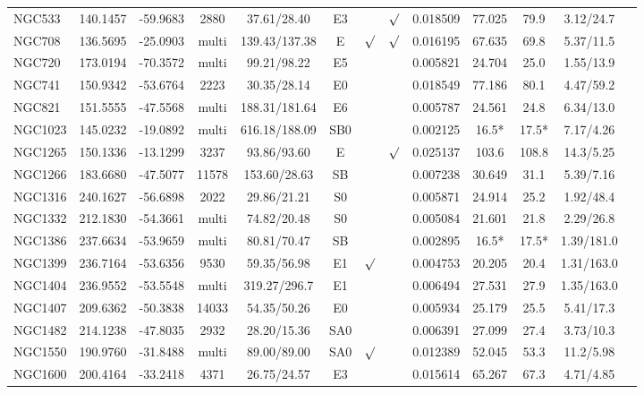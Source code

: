 \documentclass[iop]{emulateapj}
\begin{document}
\begin{table}
\begin{tabular}{lcccccccccccc}
NGC533  & 140.1457 & -59.9683 & 2880 & 37.61/28.40 & E3 & & $\surd$ & 0.018509 & 77.025 & 79.9 & 3.12/24.7  \\
NGC708  & 136.5695 & -25.0903 & multi & 139.43/137.38 & E & $\surd$ & $\surd$ & 0.016195 & 67.635 & 69.8  &  5.37/11.5 \\
NGC720  & 173.0194 & -70.3572 & multi & 99.21/98.22 & E5 &    &  & 0.005821 & 24.704 & 25.0 & 1.55/13.9  \\
NGC741  & 150.9342 & -53.6764 & 2223 & 30.35/28.14 & E0 &       &  & 0.018549 & 77.186 & 80.1 & 4.47/59.2 \\
NGC821  & 151.5555 & -47.5568 & multi & 188.31/181.64 & E6 &      &   & 0.005787 & 24.561 & 24.8  &  6.34/13.0 \\
NGC1023 & 145.0232 & -19.0892 & multi & 616.18/188.09 & SB0 &     &   & 0.002125 & 16.5* & 17.5* & 7.17/4.26 \\
NGC1265 & 150.1336 & -13.1299 & 3237  & 93.86/93.60  & E   &     & $\surd$   & 0.025137 & 103.6  & 108.8 & 14.3/5.25  \\
NGC1266 & 183.6680 & -47.5077 & 11578 & 153.60/28.63 & SB  &      &   & 0.007238 & 30.649 & 31.1 & 5.39/7.16  \\
NGC1316 & 240.1627 & -56.6898 & 2022  & 29.86/21.21  & S0 &      &   & 0.005871 & 24.914 & 25.2  & 1.92/48.4  \\
NGC1332 & 212.1830 & -54.3661 & multi  & 74.82/20.48  & S0  &    &     & 0.005084 & 21.601 & 21.8  & 2.29/26.8  \\
NGC1386 & 237.6634 & -53.9659 & multi & 80.81/70.47  & SB  &     &    & 0.002895 & 16.5* & 17.5*  & 1.39/181.0  \\
NGC1399 & 236.7164 & -53.6356 & 9530  & 59.35/56.98  & E1  & $\surd$ & & 0.004753 & 20.205 & 20.4  & 1.31/163.0  \\
NGC1404 & 236.9552 & -53.5548 & multi & 319.27/296.7  & E1  &       &  & 0.006494 & 27.531 & 27.9  & 1.35/163.0  \\
NGC1407 & 209.6362 & -50.3838 & 14033 & 54.35/50.26  & E0  &       &  & 0.005934 & 25.179 & 25.5  & 5.41/17.3  \\
NGC1482 & 214.1238 & -47.8035 & 2932  & 28.20/15.36  & SA0 &       &  & 0.006391 & 27.099 & 27.4  & 3.73/10.3  \\
NGC1550 & 190.9760 & -31.8488 & multi  & 89.00/89.00 & SA0   & $\surd$& & 0.012389 & 52.045 & 53.3 & 11.2/5.98  \\
NGC1600 & 200.4164 & -33.2418 & 4371  & 26.75/24.57  & E3  &       &  & 0.015614 & 65.267 & 67.3  & 4.71/4.85  \\ 

\end{tabular}
\end{table}
\end{document}
